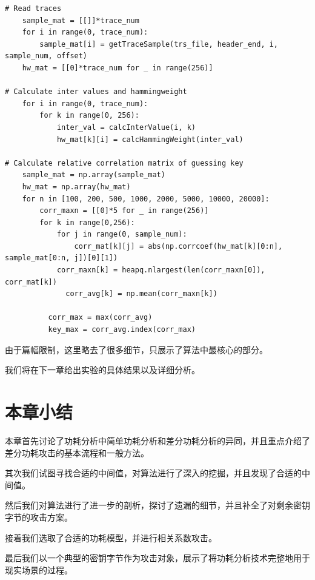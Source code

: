 \begin{lstlisting}[style=myPython,label={lst:whole_attack},caption={差分功耗分析攻击的完整流程}]
# Read traces
    sample_mat = [[]]*trace_num
    for i in range(0, trace_num):
        sample_mat[i] = getTraceSample(trs_file, header_end, i, sample_num, offset)
    hw_mat = [[0]*trace_num for _ in range(256)]

# Calculate inter values and hammingweight
    for i in range(0, trace_num):
        for k in range(0, 256):
            inter_val = calcInterValue(i, k)
            hw_mat[k][i] = calcHammingWeight(inter_val)

# Calculate relative correlation matrix of guessing key
    sample_mat = np.array(sample_mat)
    hw_mat = np.array(hw_mat)
    for n in [100, 200, 500, 1000, 2000, 5000, 10000, 20000]:
        corr_maxn = [[0]*5 for _ in range(256)]
        for k in range(0,256):
            for j in range(0, sample_num):
                corr_mat[k][j] = abs(np.corrcoef(hw_mat[k][0:n], sample_mat[0:n, j])[0][1])
            corr_maxn[k] = heapq.nlargest(len(corr_maxn[0]), corr_mat[k])
              corr_avg[k] = np.mean(corr_maxn[k])
  
          corr_max = max(corr_avg)
          key_max = corr_avg.index(corr_max)
\end{lstlisting}

由于篇幅限制，这里略去了很多细节，只展示了算法中最核心的部分。

我们将在下一章给出实验的具体结果以及详细分析。


\section{本章小结}


本章首先讨论了功耗分析中简单功耗分析和差分功耗分析的异同，并且重点介绍了差分功耗攻击的基本流程和一般方法。

其次我们试图寻找合适的中间值，对算法进行了深入的挖掘，并且发现了合适的中间值。

然后我们对算法进行了进一步的剖析，探讨了遗漏的细节，并且补全了对剩余密钥字节的攻击方案。

接着我们选取了合适的功耗模型，并进行相关系数攻击。

最后我们以一个典型的密钥字节作为攻击对象，展示了将功耗分析技术完整地用于现实场景的过程。
